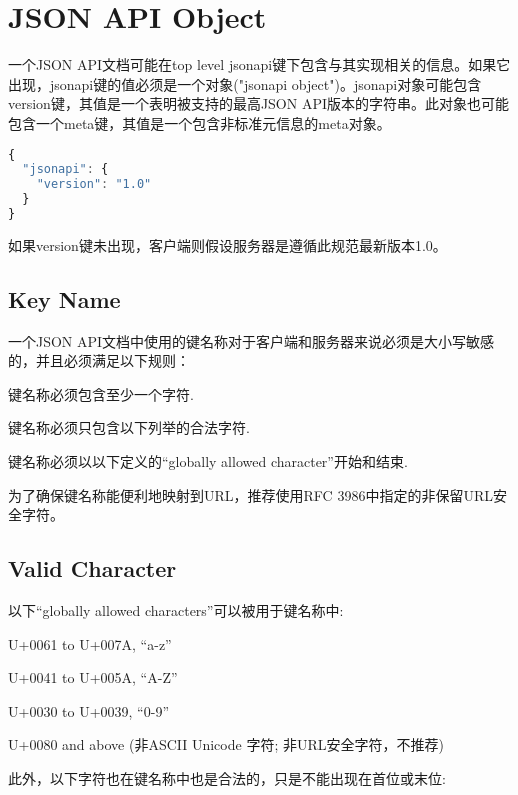 \section{JSON API Object}

一个JSON API文档可能在top level jsonapi键下包含与其实现相关的信息。如果它出现，jsonapi键的值必须是一个对象("jsonapi object")。jsonapi对象可能包含version键，其值是一个表明被支持的最高JSON API版本的字符串。此对象也可能包含一个meta键，其值是一个包含非标准元信息的meta对象。

\begin{lstlisting}[language=JavaScript]
{
  "jsonapi": {
    "version": "1.0"
  }
}
\end{lstlisting}


如果version键未出现，客户端则假设服务器是遵循此规范最新版本1.0。

\subsection{Key Name}

一个JSON API文档中使用的键名称对于客户端和服务器来说必须是大小写敏感的，并且必须满足以下规则：

\begin{compactitem}
\item 键名称必须包含至少一个字符.
\item 键名称必须只包含以下列举的合法字符.
\item 键名称必须以以下定义的“globally allowed character”开始和结束.
\end{compactitem}

为了确保键名称能便利地映射到URL，推荐使用RFC 3986中指定的非保留URL安全字符。

\subsection{Valid Character}

以下“globally allowed characters”可以被用于键名称中:

\begin{compactitem}
\item U+0061 to U+007A, “a-z”
\item U+0041 to U+005A, “A-Z”
\item U+0030 to U+0039, “0-9”
\item U+0080 and above (非ASCII Unicode 字符; 非URL安全字符，不推荐)
\end{compactitem}

此外，以下字符也在键名称中也是合法的，只是不能出现在首位或末位:

